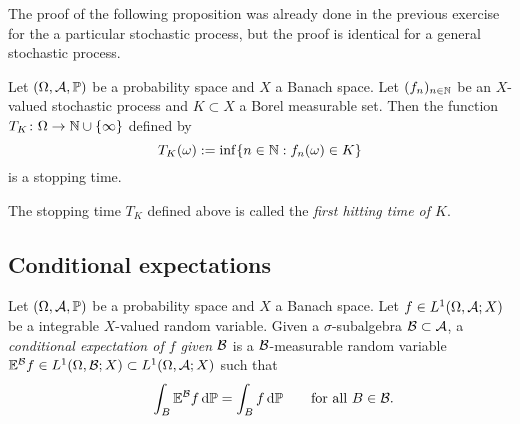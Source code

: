 The proof of the following proposition was already done in the previous exercise for the a particular stochastic process, but the proof is identical for a general stochastic process.

\begin{prop}
  Let $(\Omega, \mathcal{A}, \mathbb{P})$ be a probability space and $X$ a Banach space.
  Let $(f_n)_{n \in \mathbb{N}}$ be an $X$-valued stochastic process and $K \subset X$ a Borel measurable set.
  Then the function $T_K \colon \Omega \rightarrow \mathbb{N} \cup \{\infty\}$ defined by
  \begin{equation*}
    T_K(\omega) := \inf\{n \in \mathbb{N} : f_n(\omega) \in K \}
  \end{equation*}
  is a stopping time.
\end{prop}

The stopping time $T_K$ defined above is called the \emph{first hitting time of $K$}.

\subsection{Conditional expectations}


\begin{defn}\label{defn:conditional-expectation}
  Let $(\Omega, \mathcal{A}, \mathbb{P})$ be a probability space and $X$ a Banach space.
  Let $f \in L^1(\Omega, \mathcal{A}; X)$ be a integrable $X$-valued random variable.
  Given a $\sigma$-subalgebra $\mathcal{B} \subset \mathcal{A}$, a \emph{conditional expectation of $f$ given $\mathcal{B}$} is a $\mathcal{B}$-measurable random variable $\mathbb{E}^{\mathcal{B}}f \in L^1(\Omega, \mathcal{B}; X) \subset L^1(\Omega,\mathcal{A};X)$ such that
  \begin{equation}\label{eq:conditional-expectation-property}
    \qquad \int_B \mathbb{E}^{\mathcal{B}}f \, \mathrm{d}\mathbb{P} = \int_B f \, \mathrm{d}\mathbb{P} \qquad \text{for all $B \in \mathcal{B}$.}
  \end{equation}
\end{defn}

